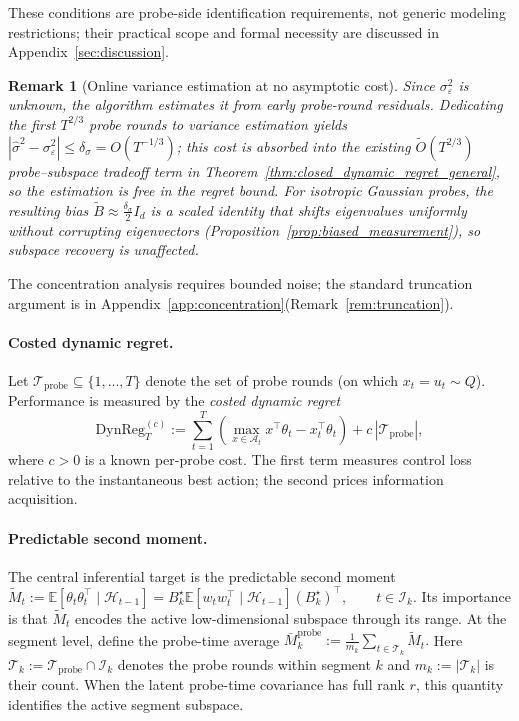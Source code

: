\documentclass{article}
\newcommand{\E}{\mathbb{E}}
\newcommand{\cA}{\mathcal{A}}
\newcommand{\cH}{\mathcal{H}}
\newcommand{\cT}{\mathcal{T}}
\newcommand{\cI}{\mathcal{I}}
\newcommand{\cTprobe}{\mathcal{T}_{\mathrm{probe}}}
\newcommand{\DynReg}{\mathrm{DynReg}}
\newtheorem{remark}{Remark}
\begin{document}
These conditions are probe-side identification requirements, not generic modeling restrictions; their practical scope and formal necessity are discussed in Appendix~\ref{sec:discussion}.
\begin{remark}[Online variance estimation at no asymptotic cost]
  \label{rem:burnin_free}
  Since $\sigma_\varepsilon^2$ is unknown, the algorithm estimates it from early probe-round residuals. Dedicating the first $T^{2/3}$ probe rounds to variance estimation yields $|\hat\sigma^2 - \sigma_\varepsilon^2| \le \delta_\sigma = O(T^{-1/3})$; this cost is absorbed into the existing $\widetilde{O}(T^{2/3})$ probe--subspace tradeoff term in Theorem~\ref{thm:closed_dynamic_regret_general}, so the estimation is \emph{free} in the regret bound. For isotropic Gaussian probes, the resulting bias $\widetilde{B} \approx \frac{\delta_\sigma}{2}I_d$ is a scaled identity that shifts eigenvalues uniformly without corrupting eigenvectors (Proposition~\ref{prop:biased_measurement}), so subspace recovery is unaffected.
  \end{remark}

The concentration analysis requires bounded noise; the standard truncation argument is in Appendix~\ref{app:concentration}(Remark~\ref{rem:truncation}).




\paragraph{Costed dynamic regret.}
Let $\cTprobe \subseteq \{1, \ldots, T\}$ denote the set of probe rounds (on which $x_t = u_t \sim Q$).
Performance is measured by the \emph{costed dynamic regret}
\begin{equation}
  \DynReg_T^{(c)} := \sum_{t=1}^T \left(\max_{x \in \cA_t} x^\top \theta_t - x_t^\top \theta_t\right) + c\,|\cTprobe|,
  \label{eq:costed_regret}
\end{equation}
where $c > 0$ is a known per-probe cost.
The first term measures control loss relative to the instantaneous best action; the second prices information acquisition.

\paragraph{Predictable second moment.} The central inferential target is the predictable second moment $\widetilde{M}_t := \E[\theta_t \theta_t^\top \mid \cH_{t-1}] = B_k^\star \E[w_t w_t^\top \mid \cH_{t-1}] (B_k^\star)^\top, \qquad t \in \cI_k.$ Its importance is that $\widetilde{M}_t$ encodes the active low-dimensional subspace through its range. At the segment level, define the probe-time average $\bar{M}_k^{\mathrm{probe}} := \frac{1}{m_k} \sum_{t \in \cT_k} \widetilde{M}_t.$ Here $\cT_k := \cTprobe \cap \cI_k$ denotes the probe rounds within segment $k$ and $m_k := |\cT_k|$ is their count. When the latent probe-time covariance has full rank $r$, this quantity identifies the active segment subspace.
\end{document}
